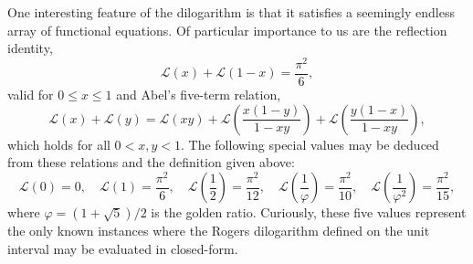\documentclass[10pt]{article}
\theoremstyle{definition}
\begin{document}
One interesting feature of the dilogarithm is that it satisfies a seemingly endless array of functional equations.  Of particular importance to us are the reflection identity,
\begin{equation}
    \mathcal{L}(x) + \mathcal{L}(1-x) = \frac{\pi^2}{6}, \label{eq:two_term}
\end{equation}
valid for $ 0 \leq x \leq 1$ and Abel's five-term relation,
\begin{equation}
    \mathcal{L}(x) + \mathcal{L}(y) = \mathcal{L}(xy) + \mathcal{L}\left(\frac{x(1-y)}{1-xy}\right) + \mathcal{L}\left(\frac{y(1-x)}{1-xy}\right), \label{eq:abel}
\end{equation}
which holds for all $0 < x,y < 1$.  The following special values may be deduced from these relations and the definition given above: 
\begin{equation*}
    \mathcal{L}\left(0\right) = 0, \quad \mathcal{L}\left(1\right) = \frac{\pi^2}{6}, \quad \mathcal{L}\left(\frac{1}{2}\right) = \frac{\pi^2}{12},\quad \mathcal{L}\left(\frac{1}{\varphi}\right) = \frac{\pi^2}{10}, \quad \mathcal{L}\left(\frac{1}{\varphi^2}\right) = \frac{\pi^2}{15},
\end{equation*}
where $\varphi = (1+\sqrt{5})/2$ is the golden ratio.  Curiously, these five values represent the only known instances where the Rogers dilogarithm defined on the unit interval may be evaluated in closed-form.    
\end{document}
